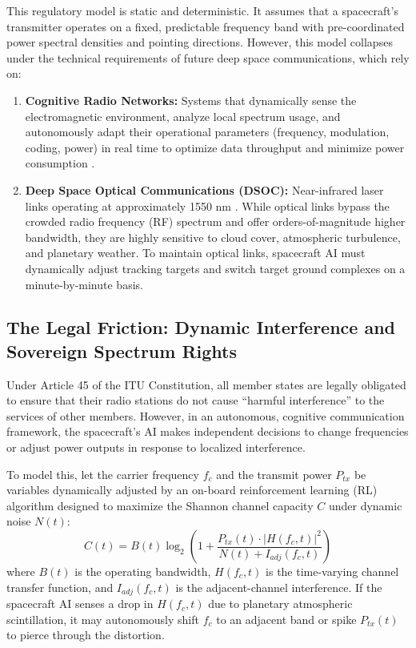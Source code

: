 \documentclass[final,5p,times,twocolumn]{elsarticle}
\begin{document}
This regulatory model is static and deterministic. It assumes that a spacecraft's transmitter operates on a fixed, predictable frequency band with pre-coordinated power spectral densities and pointing directions. However, this model collapses under the technical requirements of future deep space communications, which rely on:
\begin{enumerate}
\item \textbf{Cognitive Radio Networks:} Systems that dynamically sense the electromagnetic environment, analyze local spectrum usage, and autonomously adapt their operational parameters (frequency, modulation, coding, power) in real time to optimize data throughput and minimize power consumption \citep{zhao2022cognitive}.
\item \textbf{Deep Space Optical Communications (DSOC):} Near-infrared laser links operating at approximately 1550 nm \citep{nasa2023dsoc}. While optical links bypass the crowded radio frequency (RF) spectrum and offer orders-of-magnitude higher bandwidth, they are highly sensitive to cloud cover, atmospheric turbulence, and planetary weather. To maintain optical links, spacecraft AI must dynamically adjust tracking targets and switch target ground complexes on a minute-by-minute basis.
\end{enumerate}

\subsection{The Legal Friction: Dynamic Interference and Sovereign Spectrum Rights}

Under Article 45 of the ITU Constitution, all member states are legally obligated to ensure that their radio stations do not cause ``harmful interference'' to the services of other members. However, in an autonomous, cognitive communication framework, the spacecraft's AI makes independent decisions to change frequencies or adjust power outputs in response to localized interference.

To model this, let the carrier frequency $f_c$ and the transmit power $P_{tx}$ be variables dynamically adjusted by an on-board reinforcement learning (RL) algorithm designed to maximize the Shannon channel capacity $C$ under dynamic noise $N(t)$:
\begin{equation}
C(t) = B(t) \log_2 \left( 1 + \frac{P_{tx}(t) \cdot |H(f_c, t)|^2}{N(t) + I_{adj}(f_c, t)} \right)
\label{eq:shannon}
\end{equation}
where $B(t)$ is the operating bandwidth, $H(f_c, t)$ is the time-varying channel transfer function, and $I_{adj}(f_c, t)$ is the adjacent-channel interference. If the spacecraft AI senses a drop in $H(f_c, t)$ due to planetary atmospheric scintillation, it may autonomously shift $f_c$ to an adjacent band or spike $P_{tx}(t)$ to pierce through the distortion.
\end{document}
